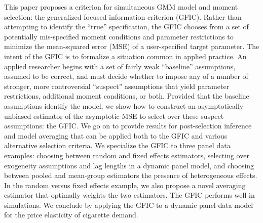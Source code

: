 This paper proposes a criterion for simultaneous GMM model and moment selection: the generalized focused information criterion (GFIC). 
Rather than attempting to identify the ``true'' specification, the GFIC chooses from a set of potentially mis-specified moment conditions and parameter restrictions to minimize the mean-squared error (MSE) of a user-specified target parameter.
The intent of the GFIC is to formalize a situation common in applied practice.
An applied researcher begins with a set of fairly weak ``baseline'' assumptions, assumed to be correct, and must decide whether to impose any of a number of stronger, more controversial ``suspect'' assumptions that yield parameter restrictions, additional moment conditions, or both.
Provided that the baseline assumptions identify the model, we show how to construct an asymptotically unbiased estimator of the asymptotic MSE to select over these suspect assumptions: the GFIC. 
We go on to provide results for post-selection inference and model averaging that can be applied both to the GFIC and various alternative selection criteria.
We specialize the GFIC to three panel data examples: choosing between random and fixed effects estimators, selecting over exogeneity assumptions and lag lengths in a dynamic panel model, and choosing between pooled and mean-group estimators the presence of heterogeneous effects. 
In the random versus fixed effects example, we also propose a novel averaging estimator that optimally weights the two estimators.
The GFIC performs well in simulations. 
We conclude by applying the GFIC to a dynamic panel data model for the price elasticity of cigarette demand. 

